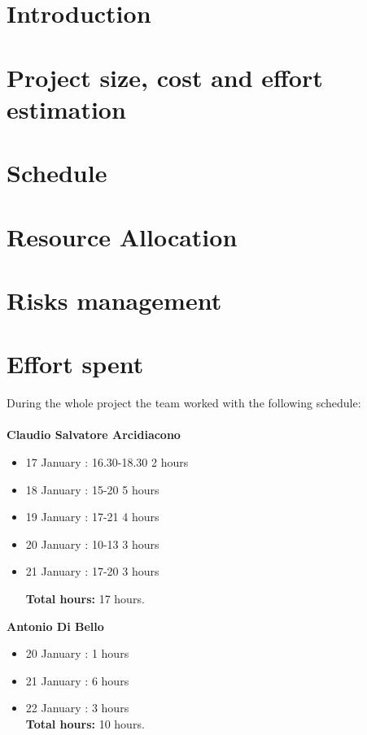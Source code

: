 \documentclass[a4paper]{article}
\begin{document}
\newpage
{}

\tableofcontents

\newpage
\section{Introduction} 


\newpage
\section{Project size, cost and effort estimation}


\newpage
\section{Schedule}


\newpage
\section{Resource Allocation}


\newpage
\section{Risks management}


\newpage
\section{Effort spent}
During the whole project the team worked with the following schedule:\\ \emph{\\}
\textbf{Claudio Salvatore Arcidiacono}
\begin{itemize}
\item 17 January  : 16.30-18.30 2 hours
\item 18 January : 15-20 5 hours
\item 19 January : 17-21 4 hours
\item 20 January : 10-13 3 hours
\item 21 January : 17-20 3 hours 

\textbf{Total hours:} 17 hours.
\end{itemize}


\textbf{Antonio Di Bello}
\begin{itemize}
\item 20 January :  1 hours
\item 21 January :  6 hours
\item 22 January :  3 hours\\

\textbf{Total hours:} 10 hours.
\end{itemize}
\end{document}
